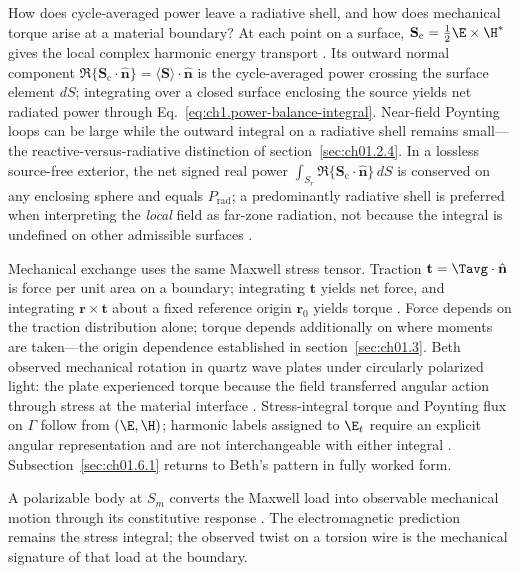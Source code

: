 How does cycle-averaged power leave a radiative shell, and how does mechanical torque arise at a material boundary? At each point on a surface, $\mathbf{S}_\mathrm{c}=\tfrac{1}{2}\E\times\H^*$ gives the local complex harmonic energy transport \cite{poynting1884,stratton1941}. Its outward normal component $\Re\{\mathbf{S}_\mathrm{c}\cdot\hat{\mathbf{n}}\}=\langle\mathbf{S}\rangle\cdot\hat{\mathbf{n}}$ is the cycle-averaged power crossing the surface element $dS$; integrating over a closed surface enclosing the source yields net radiated power through Eq.~\eqref{eq:ch1.power-balance-integral}. Near-field Poynting loops can be large while the outward integral on a radiative shell remains small---the reactive-versus-radiative distinction of section~\ref{sec:ch01.2.4}. In a lossless source-free exterior, the net signed real power $\int_{S_r}\Re\{\mathbf{S}_\mathrm{c}\cdot\hat{\mathbf{n}}\}\,dS$ is conserved on any enclosing sphere and equals $P_{\mathrm{rad}}$; a predominantly radiative shell is preferred when interpreting the \emph{local} field as far-zone radiation, not because the integral is undefined on other admissible surfaces \cite{poynting1884,stratton1941}.

Mechanical exchange uses the same Maxwell stress tensor. Traction $\mathbf{t}=\Tavg\cdot\hat{\mathbf{n}}$ is force per unit area on a boundary; integrating $\mathbf{t}$ yields net force, and integrating $\mathbf{r}\times\mathbf{t}$ about a fixed reference origin $\mathbf{r}_0$ yields torque \cite{maxwell1873,beth1936}. Force depends on the traction distribution alone; torque depends additionally on where moments are taken---the origin dependence established in section~\ref{sec:ch01.3}. Beth \cite{beth1936} observed mechanical rotation in quartz wave plates under circularly polarized light: the plate experienced torque because the field transferred angular action through stress at the material interface \cite{allen1992}. Stress-integral torque and Poynting flux on $\Gamma$ follow from $(\E,\H)$; harmonic labels assigned to $\E_t$ require an explicit angular representation and are not interchangeable with either integral \cite{stratton1941}. Subsection~\ref{sec:ch01.6.1} returns to Beth's pattern in fully worked form.

A polarizable body at $S_m$ converts the Maxwell load into observable mechanical motion through its constitutive response \cite{beth1936,stratton1941}. The electromagnetic prediction remains the stress integral; the observed twist on a torsion wire is the mechanical signature of that load at the boundary.


